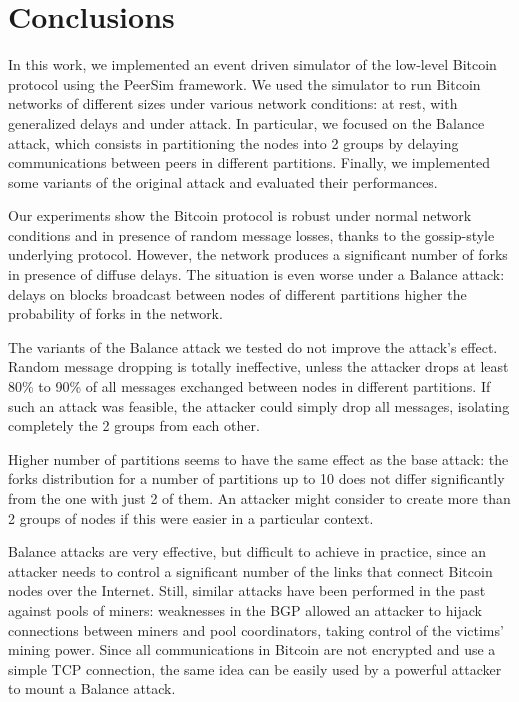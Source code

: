 \chapter{Conclusions}
\label{chapter:conclusions}
In this work, we implemented an event driven simulator of the low-level Bitcoin protocol using the PeerSim framework.
We used the simulator to run Bitcoin networks of different sizes under various network conditions: at rest, with generalized delays and under attack.
In particular, we focused on the Balance attack, which consists in partitioning the nodes into \num{2} groups by delaying communications between peers in different partitions.
Finally, we implemented some variants of the original attack and evaluated their performances.

Our experiments show the Bitcoin protocol is robust under normal network conditions and in presence of random message losses, thanks to the gossip-style underlying protocol.
However, the network produces a significant number of forks in presence of diffuse delays.
The situation is even worse under a Balance attack:
delays on blocks broadcast between nodes of different partitions higher the probability of forks in the network.

The variants of the Balance attack we tested do not improve the attack's effect.
Random message dropping is totally ineffective, unless the attacker drops at least \num{80}\% to \num{90}\% of all messages exchanged between nodes in different partitions.
If such an attack was feasible, the attacker could simply drop all messages, isolating completely the \num{2} groups from each other.

Higher number of partitions seems to have the same effect as the base attack:
the forks distribution for a number of partitions up to \num{10} does not differ significantly from the one with just \num{2} of them.
An attacker might consider to create more than \num{2} groups of nodes if this were easier in a particular context.

Balance attacks are very effective, but difficult to achieve in practice, since an attacker needs to control a significant number of the links that connect Bitcoin nodes over the Internet.
Still, similar attacks have been performed in the past against pools of miners:
weaknesses in the \ac{BGP} allowed an attacker to hijack connections between miners and pool coordinators, taking control of the victims' mining power.
Since all communications in Bitcoin are not encrypted and use a simple TCP connection, the same idea can be easily used by a powerful attacker to mount a Balance attack.


